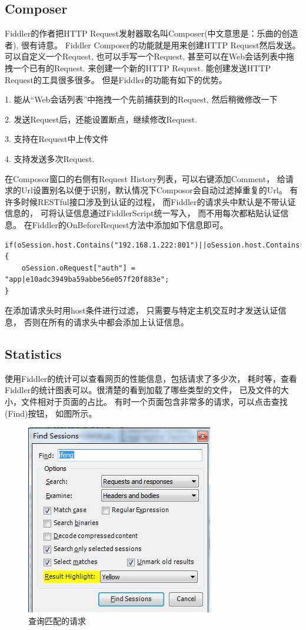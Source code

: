 \documentclass{book}
\begin{document}
\subsection{Composer}

Fiddler的作者把HTTP Request发射器取名叫Composer(中文意思是：乐曲的创造者), 很有诗意。
Fiddler Composer的功能就是用来创建HTTP Request然后发送。 
可以自定义一个Request, 也可以手写一个Request, 
甚至可以在Web会话列表中拖拽一个已有的Request. 来创建一个新的HTTP Request.
能创建发送HTTP Request的工具很多很多。 但是Fiddler的功能有如下的优势。

1. 能从“Web会话列表”中拖拽一个先前捕获到的Request, 然后稍微修改一下

2. 发送Request后，还能设置断点，继续修改Request.

3. 支持在Request中上传文件

4. 支持发送多次Request.

在Composor窗口的右侧有Request History列表，可以右键添加Comment，
给请求的Url设置别名以便于识别，默认情况下Composor会自动过滤掉重复的Url。
有许多时候RESTful接口涉及到认证的过程，
而Fiddler的请求头中默认是不带认证信息的，
可将认证信息通过FiddlerScript统一写入，
而不用每次都粘贴认证信息。
在Fiddler的OnBeforeRequest方法中添加如下信息即可。

\begin{lstlisting}[language={[Sharp]C}]
if(oSession.host.Contains("192.168.1.222:801")||oSession.host.Contains("129.89.81.118:801"))
{
    oSession.oRequest["auth"] = "app|e10adc3949ba59abbe56e057f20f883e";
}
\end{lstlisting}

在添加请求头时用host条件进行过滤，
只需要与特定主机交互时才发送认证信息，
否则在所有的请求头中都会添加上认证信息。

\subsection{Statistics}

使用Fiddler的统计可以查看网页的性能信息，包括请求了多少次，
耗时等，查看Fiddler的统计图表可以。很清楚的看到加载了哪些类型的文件，
已及文件的大小，文件相对于页面的占比。
有时一个页面包含非常多的请求，可以点击查找(Find)按钮，
如图所示。

\begin{figure}[htbp]
	\centering
	\includegraphics[scale=0.8]{WebsiteUrlMatch.jpg}
	\caption{查询匹配的请求}
	\label{fig:WebsiteUrlMatch}
\end{figure}
\end{document}
